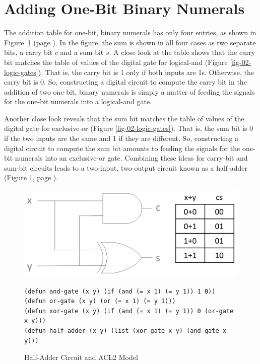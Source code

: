 \section{Adding One-Bit Binary Numerals}
\label{sec:adding-1-bit-numerals}

The addition table for one-bit, binary numerals
has only four entries, as shown in
Figure~\ref{fig:half-adder} (page \pageref{fig:half-adder}).
In the figure, the sum is shown in all four cases as two separate bits,
a carry bit $c$ and a sum bit $s$.
A close look at the table shows that
the carry bit matches the table of values of the
digital gate for logical-and (Figure \ref{fig-02-logic-gates}).
That is, the carry bit is 1 only if both inputs are 1s.
Otherwise, the carry bit is 0.
So, constructing a digital circuit to compute the carry bit
in the addition of two one-bit, binary numerals is simply
a matter of feeding the signals for the one-bit numerals
into a logical-and gate.

Another close look reveals that the sum bit
matches the table of values of the
digital gate for exclusive-or (Figure \ref{fig-02-logic-gates}).
That is, the sum bit is 0 if the two inputs are the same
and 1 if they are different.
So, constructing a digital circuit to compute the sum bit
amounts to feeding the signals for the one-bit numerals
into an exclusive-or gate.
Combining these ideas for carry-bit and sum-bit circuits
leads to a two-input, two-output circuit known as a
half-adder (Figure \ref{fig:half-adder}, page \pageref{fig:half-adder}).

\begin{figure}
\begin{center}
\includegraphics[scale=0.23]{Images/half-adder.png}
\begin{Verbatim}
(defun and-gate (x y) (if (and (= x 1) (= y 1)) 1 0))
(defun or-gate (x y) (or (= x 1) (= y 1)))
(defun xor-gate (x y) (if (and (= x 1) (= y 1)) 0 (or-gate x y)))
(defun half-adder (x y) (list (xor-gate x y) (and-gate x y)))
\end{Verbatim}
\end{center}
\caption{Half-Adder Circuit and ACL2 Model}
\label{fig:half-adder}
\end{figure}

